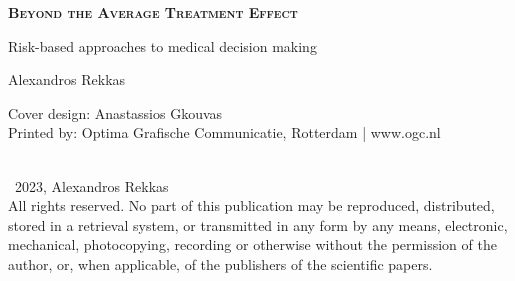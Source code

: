 


\clearpage\null\pagestyle{empty}
\newpage


\pagestyle{empty}

\def\drop{.1\textheight}

\vspace*{6cm}
\begin{center}
\Large \textbf{\textsc{Beyond the Average Treatment Effect}}\par
\Large Risk-based approaches to medical decision making \par

\vspace*{1.8cm}

\Large Alexandros Rekkas

\end{center}

\clearpage

\thispagestyle{empty}
\vspace*{12cm}

\begingroup %
\small
\setlength{\parskip}{\baselineskip} %
\setlength\parindent{0pt} %
Cover design: Anastassios Gkouvas \\
Printed by: Optima Grafische Communicatie, Rotterdam | www.ogc.nl\\
\\
\begin{flushleft}
\textcopyright\ 2023, Alexandros Rekkas \\
All rights reserved. No part of this publication may be reproduced, distributed,
stored in a retrieval system, or transmitted in any form by any means, electronic,
mechanical, photocopying, recording or otherwise without the permission of the
author, or, when applicable, of the publishers of the scientific papers.
\end{flushleft}

\endgroup

\newpage
\thispagestyle{empty}

